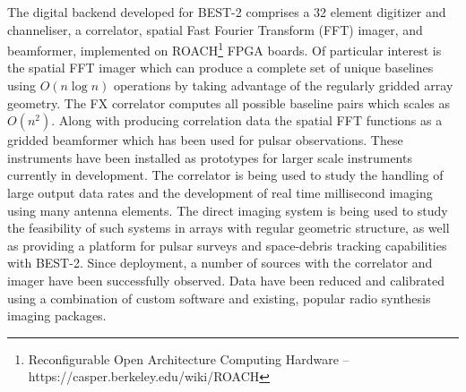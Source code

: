 \documentclass[useAMS,macros,usenatbib,onecolumn]{mn2e}
\begin{document}
The digital backend developed for BEST-2 comprises a 32 element digitizer and channeliser, a correlator, spatial Fast Fourier Transform (FFT) imager, and beamformer, implemented on ROACH\footnote{Reconfigurable Open Architecture Computing Hardware -- https://casper.berkeley.edu/wiki/ROACH} FPGA boards.
Of particular interest is the spatial FFT imager which can produce a complete set of unique baselines using $O(n \log n)$ operations by taking advantage of the regularly gridded array geometry.
The FX correlator computes all possible baseline pairs which scales as $O(n^2)$.
Along with producing correlation data the spatial FFT functions as a gridded beamformer which has been used for pulsar observations.
These instruments have been installed as prototypes for larger scale instruments currently in development.
The correlator is being used to study the handling of large output data rates and the development of real time millisecond imaging using many antenna elements.
The direct imaging system is being used to study the feasibility of such systems in arrays with regular geometric structure, as well as providing a platform for pulsar surveys and space-debris tracking capabilities with BEST-2.
Since deployment, a number of sources with the correlator and imager have been successfully observed.
Data have been reduced and calibrated using a combination of custom software and existing, popular radio synthesis imaging packages.
\end{document}
